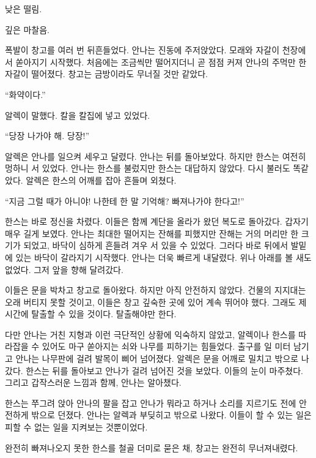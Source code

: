 낮은 떨림.

깊은 마찰음.

폭발이 창고를 여러 번 뒤흔들었다. 안나는 진동에 주저앉았다. 모래와 자갈이 천장에서 쏟아지기 시작했다. 처음에는 조금씩만 떨어지더니 곧 점점 커져 안나의 주먹만 한 자갈이 떨어졌다. 창고는 금방이라도 무너질 것만 같았다.

``화약이다.''

알렉이 말했다. 칼을 칼집에 넣고 있었다.

``당장 나가야 해. 당장!''

알렉은 안나를 일으켜 세우고 달렸다. 안나는 뒤를 돌아보았다. 하지만 한스는 여전히 멍하니 서 있었다. 안나는 한스를 불렀지만 한스는 대답하지 않았다. 다시 불러도 똑같았다. 알렉은 한스의 어깨를 잡아 흔들며 외쳤다.

``지금 그럴 때가 아니야! 나한테 한 말 기억해? 빠져나가야 한다고!''

한스는 바로 정신을 차렸다. 이들은 함께 계단을 올라가 왔던 복도로 돌아갔다. 갑자기 매우 길게 보였다. 안나는 최대한 떨어지는 잔해를 피했지만 잔해는 거의 머리만 한 크기가 되었고, 바닥이 심하게 흔들려 겨우 서 있을 수 있었다. 그러다 바로 뒤에서 발밑에 있는 바닥이 갈라지기 시작했다. 안나는 더욱 빠르게 내달렸다. 위나 아래를 볼 새도 없었다. 그저 앞을 향해 달려갔다.

이들은 문을 박차고 창고로 돌아왔다. 하지만 아직 안전하지 않았다. 건물의 지지대는 오래 버티지 못할 것이고, 이들은 창고 깊숙한 곳에 있어 계속 뛰어야 했다. 그래도 제시간에 탈출할 수 있을 것이다. 탈출해야만 한다.

다만 안나는 거친 지형과 이런 극단적인 상황에 익숙하지 않았고, 알렉이나 한스를 따라잡을 수 있어도 마구 쏟아지는 쇠와 나무를 피하기는 힘들었다. 출구를 일 미터 남기고 안나는 나무판에 걸려 발목이 삐어 넘어졌다. 알렉은 문을 어깨로 밀치고 밖으로 나갔다. 한스는 뒤를 돌아보고 안나가 걸려 넘어진 것을 보았다. 이들의 눈이 마주쳤다. 그리고 갑작스러운 느낌과 함께, 안나는 알아챘다.

한스는 쭈그려 앉아 안나의 팔을 잡고 안나가 뭐라고 하거나 소리를 지르기도 전에 안전하게 밖으로 던졌다. 안나는 알렉과 부딪히고 밖으로 나왔다. 이들이 할 수 있는 일은 피할 수 없는 일을 지켜보는 것뿐이었다.

완전히 빠져나오지 못한 한스를 철골 더미로 묻은 채, 창고는 완전히 무너져내렸다.

